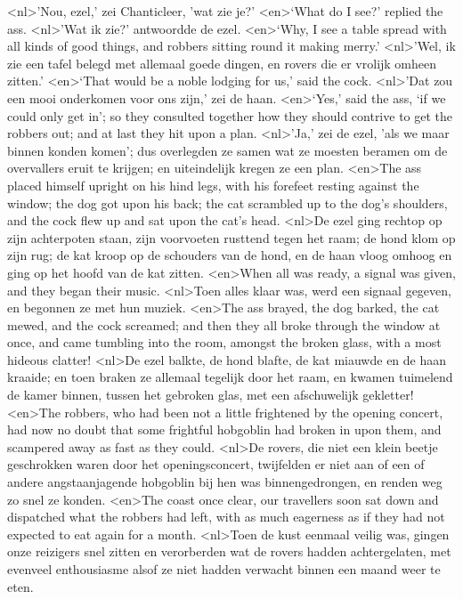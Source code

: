<nl>'Nou, ezel,' zei Chanticleer, 'wat zie je?'
<en>‘What do I see?’ replied the ass.
<nl>'Wat ik zie?' antwoordde de ezel.
<en>‘Why, I see a table spread with all kinds of good things, and robbers sitting round it making merry.’
<nl>'Wel, ik zie een tafel belegd met allemaal goede dingen, en rovers die er vrolijk omheen zitten.'
<en>‘That would be a noble lodging for us,’ said the cock.
<nl>'Dat zou een mooi onderkomen voor ons zijn,' zei de haan.
<en>‘Yes,’ said the ass, ‘if we could only get in’; so they consulted together how they should contrive to get the robbers out; and at last they hit upon a plan.
<nl>'Ja,' zei de ezel, 'als we maar binnen konden komen'; dus overlegden ze samen wat  ze  moesten beramen om de overvallers eruit te krijgen; en uiteindelijk kregen ze een plan.
<en>The ass placed himself upright on his hind legs, with his forefeet resting against the window; the dog got upon his back; the cat scrambled up to the dog’s shoulders, and the cock flew up and sat upon the cat’s head.
<nl>De ezel ging rechtop op zijn achterpoten staan, zijn voorvoeten rusttend tegen het raam; de hond klom op zijn rug; de kat kroop op  de schouders van de hond, en de haan vloog omhoog en ging op het hoofd van de kat zitten.
<en>When all was ready, a signal was given, and they began their music.
<nl>Toen alles klaar was, werd  een signaal gegeven, en begonnen ze met hun muziek.
<en>The ass brayed, the dog barked, the cat mewed, and the cock screamed; and then they all broke through the window at once, and came tumbling into the room, amongst the broken glass, with a most hideous clatter!
<nl>De ezel balkte, de hond blafte, de kat miauwde en de haan kraaide; en toen braken ze allemaal tegelijk door het raam, en kwamen tuimelend de kamer binnen, tussen het gebroken glas, met een  afschuwelijk gekletter!
<en>The robbers, who had been not a little frightened by the opening concert, had now no doubt that some frightful hobgoblin had broken in upon them, and scampered away as fast as they could.
<nl>De rovers, die niet een klein beetje geschrokken waren door het openingsconcert, twijfelden er niet aan of een of andere angstaanjagende hobgoblin bij hen was binnengedrongen, en renden weg zo snel ze konden.
<en>The coast once clear, our travellers soon sat down and dispatched what the robbers had left, with as much eagerness as if they had not expected to eat again for a month.
<nl>Toen de kust eenmaal veilig was, gingen onze reizigers snel zitten en verorberden wat de rovers hadden achtergelaten, met evenveel enthousiasme alsof ze niet hadden verwacht binnen een maand weer te eten.
